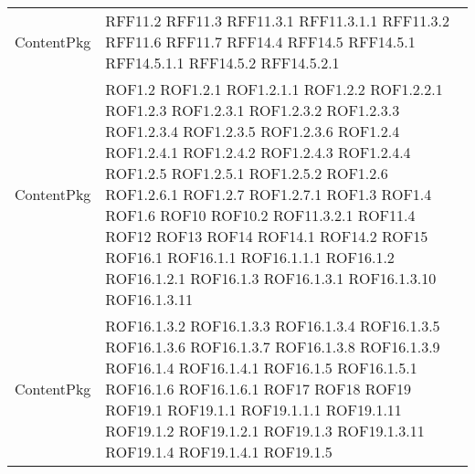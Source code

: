 \begin{longtable}{p{5cm}!{\VRule[1pt]}p{2.5cm}}
		ContentPkg & RFF11.2 \newline RFF11.3 \newline RFF11.3.1 \newline RFF11.3.1.1 \newline RFF11.3.2 \newline RFF11.6 \newline RFF11.7 \newline RFF14.4 \newline RFF14.5 \newline RFF14.5.1 \newline RFF14.5.1.1 \newline RFF14.5.2 \newline RFF14.5.2.1 \\
		ContentPkg & ROF1.2 \newline ROF1.2.1 \newline ROF1.2.1.1 \newline ROF1.2.2 \newline ROF1.2.2.1 \newline ROF1.2.3 \newline ROF1.2.3.1 \newline ROF1.2.3.2 \newline ROF1.2.3.3 \newline ROF1.2.3.4 \newline ROF1.2.3.5 \newline ROF1.2.3.6 \newline ROF1.2.4 \newline ROF1.2.4.1 \newline ROF1.2.4.2 \newline ROF1.2.4.3 \newline ROF1.2.4.4 \newline ROF1.2.5 \newline ROF1.2.5.1 \newline ROF1.2.5.2 \newline ROF1.2.6 \newline ROF1.2.6.1 \newline ROF1.2.7 \newline ROF1.2.7.1 \newline ROF1.3 \newline ROF1.4 \newline ROF1.6 \newline ROF10 \newline ROF10.2 \newline ROF11.3.2.1 \newline ROF11.4 \newline ROF12 \newline ROF13 \newline ROF14 \newline ROF14.1 \newline ROF14.2 \newline ROF15 \newline ROF16.1 \newline ROF16.1.1 \newline ROF16.1.1.1 \newline ROF16.1.2 \newline ROF16.1.2.1 \newline ROF16.1.3 \newline ROF16.1.3.1 \newline ROF16.1.3.10 \newline ROF16.1.3.11 \\
		ContentPkg & ROF16.1.3.2 \newline ROF16.1.3.3 \newline ROF16.1.3.4 \newline ROF16.1.3.5 \newline ROF16.1.3.6 \newline ROF16.1.3.7 \newline ROF16.1.3.8 \newline ROF16.1.3.9 \newline ROF16.1.4 \newline ROF16.1.4.1 \newline ROF16.1.5 \newline ROF16.1.5.1 \newline ROF16.1.6 \newline ROF16.1.6.1 \newline ROF17 \newline ROF18 \newline ROF19 \newline ROF19.1 \newline ROF19.1.1 \newline ROF19.1.1.1 \newline ROF19.1.11 \newline ROF19.1.2 \newline ROF19.1.2.1 \newline ROF19.1.3 \newline ROF19.1.3.11 \newline ROF19.1.4 \newline ROF19.1.4.1 \newline ROF19.1.5 \newli
\end{longtable}
